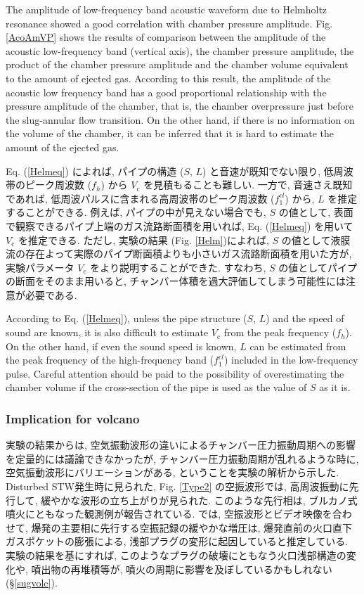 \documentclass[12pt]{article}
\begin{document}
The amplitude of low-frequency band acoustic waveform due to Helmholtz resonance showed a good correlation with chamber pressure amplitude.
Fig. \ref{AcoAmVP} shows the results of comparison between the amplitude of the acoustic low-frequency band (vertical axis), the chamber pressure amplitude, the product of the chamber pressure amplitude and the chamber volume equivalent to the amount of ejected gas.
According to this result, the amplitude of the acoustic low frequency band has a good proportional relationship with the pressure amplitude of the chamber, that is, the chamber overpressure just before the slug-annular flow transition.
On the other hand, if there is no information on the volume of the chamber, it can be inferred that it is hard to estimate the amount of the ejected gas.


Eq. (\ref{Helmeq}) によれば, パイプの構造 ($S$, $L$) と音速が既知でない限り, 低周波帯のピーク周波数  ($f_{h}$)  から $V_\mathrm{c}$ を見積もることも難しい. 
一方で, 音速さえ既知であれば, 低周波パルスに含まれる高周波帯のピーク周波数 ($f^{cl}_{1}$) から, $L$ を推定することができる.
 例えば, パイプの中が見えない場合でも, $S$ の値として, 表面で観察できるパイプ上端のガス流路断面積を用いれば, Eq. (\ref{Helmeq}) を用いて $V_\mathrm{c}$ を推定できる. 
ただし, 実験の結果 (Fig. \ref{Helm})によれば, $S$ の値として液膜流の存在よって実際のパイプ断面積よりも小さいガス流路断面積を用いた方が, 実験パラメータ $V_\mathrm{c}$ をより説明することができた. すなわち, $S$ の値としてパイプの断面をそのまま用いると, チャンバー体積を過大評価してしまう可能性には注意が必要である.

According to Eq. (\ref{Helmeq}), unless the pipe structure ($S$, $L$) and the speed of sound are known, it is also difficult to estimate $V_\mathrm{c}$ from the peak frequency ($f_{h}$).
On the other hand, if even the sound speed is known, $L$ can be estimated from the peak frequency of the high-frequency band ($f^{cl}_{1}$) included in the low-frequency pulse.
Careful attention should be paid to the possibility of overestimating the chamber volume if the cross-section of the pipe is used as the value of $S$ as it is.

\clearpage
\subsubsection{Implication for volcano}\label{acoshisa}
実験の結果からは, 空気振動波形の違いによるチャンバー圧力振動周期への影響を定量的には議論できなかったが, チャンバー圧力振動周期が乱れるような時に, 空気振動波形にバリエーションがある, ということを実験の解析から示した.
Disturbed STW発生時に見られた, Fig. \ref{Type2} の空振波形では, 高周波振動に先行して, 緩やかな波形の立ち上がりが見られた. 
このような先行相は, ブルカノ式噴火にともなった観測例が報告されている.
 \cite{Yokoo2009}では, 空振波形とビデオ映像を合わせて, 爆発の主要相に先行する空振記録の緩やかな増圧は, 爆発直前の火口直下ガスポケットの膨張による, 浅部プラグの変形に起因していると推定している. 
実験の結果を基にすれば, このようなプラグの破壊にともなう火口浅部構造の変化や, 噴出物の再堆積等が, 噴火の周期に影響を及ぼしているかもしれない (\S \ref{sugvolc}). 
\end{document}
